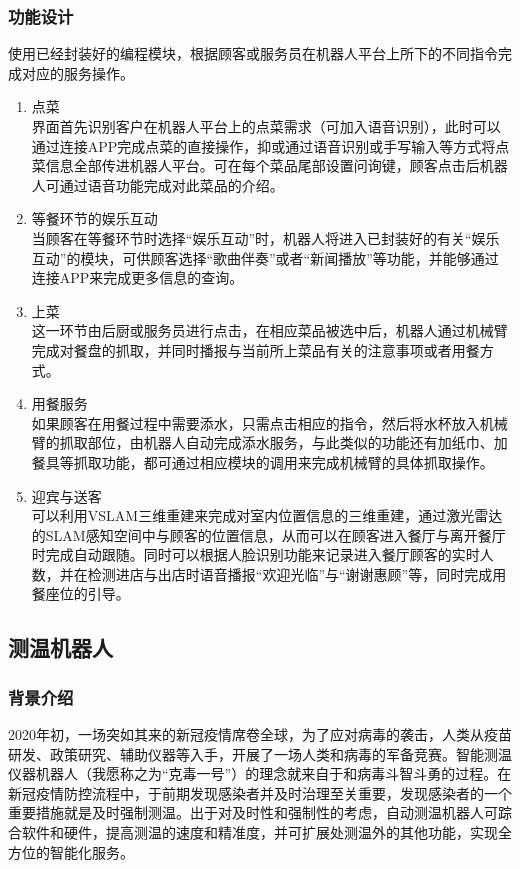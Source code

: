 \documentclass[11pt]{article}
\begin{document}
\subsubsection{功能设计}
使用已经封装好的编程模块，根据顾客或服务员在机器人平台上所下的不同指令完成对应的服务操作。
\begin{enumerate}
    \item 点菜\\
    界面首先识别客户在机器人平台上的点菜需求（可加入语音识别），此时可以通过连接APP完成点菜的直接操作，抑或通过语音识别或手写输入等方式将点菜信息全部传进机器人平台。可在每个菜品尾部设置问询键，顾客点击后机器人可通过语音功能完成对此菜品的介绍。
    \item 等餐环节的娱乐互动\\
    当顾客在等餐环节时选择“娱乐互动”时，机器人将进入已封装好的有关“娱乐互动”的模块，可供顾客选择“歌曲伴奏”或者“新闻播放”等功能，并能够通过连接APP来完成更多信息的查询。
    \item 上菜\\
    这一环节由后厨或服务员进行点击，在相应菜品被选中后，机器人通过机械臂完成对餐盘的抓取，并同时播报与当前所上菜品有关的注意事项或者用餐方式。
    \item 用餐服务\\
    如果顾客在用餐过程中需要添水，只需点击相应的指令，然后将水杯放入机械臂的抓取部位，由机器人自动完成添水服务，与此类似的功能还有加纸巾、加餐具等抓取功能，都可通过相应模块的调用来完成机械臂的具体抓取操作。
    \item 迎宾与送客\\
    可以利用VSLAM三维重建来完成对室内位置信息的三维重建，通过激光雷达的SLAM感知空间中与顾客的位置信息，从而可以在顾客进入餐厅与离开餐厅时完成自动跟随。同时可以根据人脸识别功能来记录进入餐厅顾客的实时人数，并在检测进店与出店时语音播报“欢迎光临”与“谢谢惠顾”等，同时完成用餐座位的引导。
\end{enumerate}
\subsection{测温机器人}
\subsubsection{背景介绍}
2020年初，一场突如其来的新冠疫情席卷全球，为了应对病毒的袭击，人类从疫苗研发、政策研究、辅助仪器等入手，开展了一场人类和病毒的军备竞赛。智能测温仪器机器人（我愿称之为“克毒一号”）的理念就来自于和病毒斗智斗勇的过程。在新冠疫情防控流程中，于前期发现感染者并及时治理至关重要，发现感染者的一个重要措施就是及时强制测温。出于对及时性和强制性的考虑，自动测温机器人可踪合软件和硬件，提高测温的速度和精准度，并可扩展处测温外的其他功能，实现全方位的智能化服务。
\end{document}
